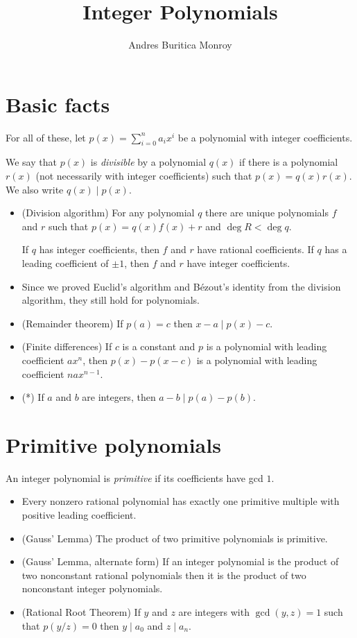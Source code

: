 \documentclass{article}
\title{Integer Polynomials}
\author{Andres Buritica Monroy}
\date{}
\begin{document}
\maketitle
\section{Basic facts}
For all of these, let $p(x)=\sum_{i=0}^n a_i x^i$ be a polynomial with integer
coefficients. 

We say that $p(x)$ is \emph{divisible} by a polynomial $q(x)$ if there is a
polynomial $r(x)$ (not necessarily with integer coefficients) such that
$p(x)=q(x)r(x)$. We also write $q(x)\mid p(x)$.
\begin{itemize}
  \item (Division algorithm) For any polynomial $q$ there are unique
    polynomials $f$ and $r$ such that $p(x)=q(x)f(x)+r$ and $\deg R<\deg q$.

    If $q$ has integer coefficients, then $f$ and $r$ have rational
    coefficients. If $q$ has a leading coefficient of $\pm 1$, then $f$ and $r$
    have integer coefficients.
  \item Since we proved Euclid's algorithm and B\'ezout's identity from the
    division algorithm, they still hold for polynomials.
  \item (Remainder theorem) If $p(a)=c$ then $x-a\mid p(x)-c$.
  \item (Finite differences) If $c$ is a constant and $p$ is a polynomial with
    leading coefficient $ax^n$, then $p(x)-p(x-c)$ is a polynomial with
    leading coefficient $nax^{n-1}$.
  \item (*) If $a$ and $b$ are integers, then $a-b\mid p(a)-p(b)$.
\end{itemize}
\section{Primitive polynomials}
An integer polynomial is \emph{primitive} if its coefficients have gcd $1$.
\begin{itemize}
  \item Every nonzero rational polynomial has exactly one primitive multiple
    with positive leading coefficient.
  \item (Gauss' Lemma) The product of two primitive polynomials is primitive.
  \item (Gauss' Lemma, alternate form) If an integer polynomial is the product
    of two nonconstant rational polynomials then it is the product of two
    nonconstant integer polynomials.
  \item (Rational Root Theorem) If $y$ and $z$ are integers with $\gcd(y,z)=1$
    such that $p(y/z)=0$ then $y\mid a_0$ and $z\mid a_n$.
\end{itemize}
\end{document}
